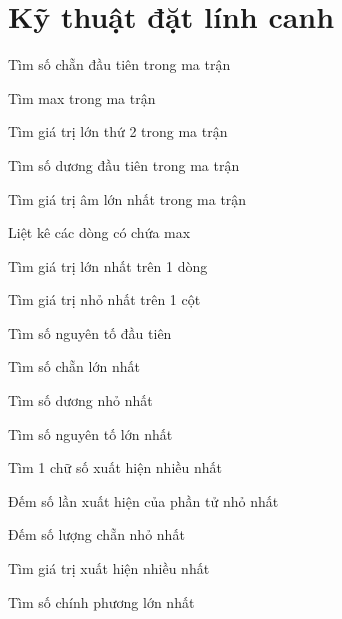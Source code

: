 \section{Kỹ thuật đặt lính canh}
\begin{problem}
    Tìm số chẵn đầu tiên trong ma trận
\end{problem}
\begin{problem}
    Tìm max trong ma trận
\end{problem}
\begin{problem}
    Tìm giá trị lớn thứ 2 trong ma trận
\end{problem}
\begin{problem}
    Tìm số dương đầu tiên trong ma trận
\end{problem}
\begin{problem}
    Tìm giá trị âm lớn nhất trong ma trận
\end{problem}
\begin{problem}
    Liệt kê các dòng có chứa max
\end{problem}
\begin{problem}
    Tìm giá trị lớn nhất trên 1 dòng
\end{problem}
\begin{problem}
    Tìm giá trị nhỏ nhất trên 1 cột
\end{problem}
\begin{problem}
    Tìm số nguyên tố đầu tiên
\end{problem}
\begin{problem}
    Tìm số chẵn lớn nhất
\end{problem}
\begin{problem}
    Tìm số dương nhỏ nhất
\end{problem}
\begin{problem}
    Tìm số nguyên tố lớn nhất
\end{problem}
\begin{problem}
    Tìm 1 chữ số xuất hiện nhiều nhất
\end{problem}
\begin{problem}
     Đếm số lần xuất hiện của phần tử nhỏ nhất
\end{problem}
\begin{problem}
    Đếm số lượng chẵn nhỏ nhất
\end{problem}
\begin{problem}
    Tìm giá trị xuất hiện nhiều nhất
\end{problem}
\begin{problem}
    Tìm số chính phương lớn nhất
\end{problem}
